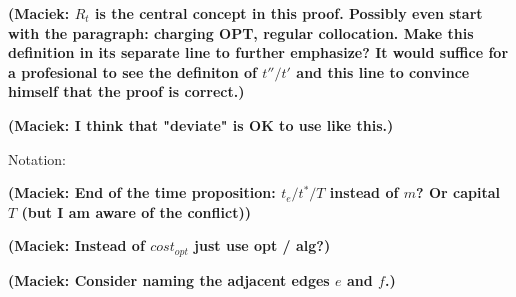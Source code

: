 \documentclass[manuscript,screen=true, review, anonymous]{acmart}
\newcommand\maciek[1]{\color{brown}\textbf{(Maciek: #1)}\color{black}}
\begin{document}
\maciek{$R_t$ is the central concept in this proof. Possibly even start with the paragraph: charging OPT, regular collocation. Make this definition in its separate line to further emphasize? It would suffice for a profesional to see the definiton of $t''/t'$ and this line to convince himself that the proof is correct.}

\maciek{I think that "deviate" is OK to use like this.}

Notation:

\maciek{End of the time proposition: $t_e / t^* / T$ instead of $m$? Or capital $T$ (but I am aware of the conflict)}

\maciek{Instead of $cost_{opt}$ just use opt / alg?}

\maciek{Consider naming the adjacent edges $e$ and $f$.}

\end{document}
